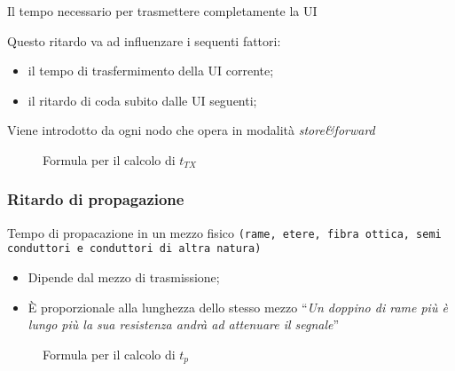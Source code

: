 \begin{defi}
  Il tempo necessario per trasmettere completamente la UI
\end{defi}
Questo ritardo va ad influenzare i sequenti fattori:
\begin{itemize}
\item il tempo di trasfermimento della UI corrente;
\item il ritardo di coda subito dalle UI seguenti; 
\end{itemize}
Viene introdotto da ogni nodo che opera in modalità \textit{store\&forward}
\begin{figure}[!ht]
  \centering
  
  \caption{Formula per il calcolo di $t_{TX}$}
  \label{fig:tTXfm}
\end{figure}

\subsubsection{Ritardo di propagazione}
\label{sec:Ritardodipropagazione}
\begin{defi}
  Tempo di propacazione in un mezzo fisico {\tt (rame, etere, fibra ottica, semi conduttori e conduttori di
    altra natura)}
\end{defi}
\begin{itemize}
\item Dipende dal mezzo di trasmissione;
\item È proporzionale alla lunghezza dello stesso mezzo ``{\it Un doppino di rame più è lungo più la sua
  resistenza andrà ad attenuare il segnale}''
\end{itemize}
\begin{figure}[!ht]
  \centering
  
  \caption{Formula per il calcolo di $t_{p}$}
  \label{fig:tpfm}
\end{figure}
